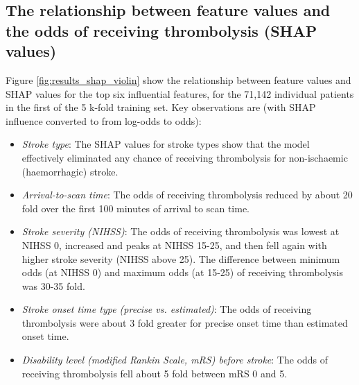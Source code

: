 
\subsection{The relationship between feature values and the odds of receiving thrombolysis (SHAP values)}

Figure \ref{fig:results_shap_violin} show the relationship between feature values and SHAP values for the top six influential features, for the 71,142 individual patients in the first of the 5 k-fold training set. Key observations are (with SHAP influence converted to from log-odds to odds):

\begin{itemize}
    \item \emph{Stroke type}: The SHAP values for stroke types show that the model effectively eliminated any chance of receiving thrombolysis for non-ischaemic (haemorrhagic) stroke.
    \item \emph{Arrival-to-scan time}: The odds of receiving thrombolysis reduced by about 20 fold over the first 100 minutes of arrival to scan time.
    \item \emph{Stroke severity (NIHSS)}: The odds of receiving thrombolysis was lowest at NIHSS 0, increased and peaks at NIHSS 15-25, and then fell again with higher stroke severity (NIHSS above 25). The difference between minimum odds (at NIHSS 0) and maximum odds (at 15-25) of receiving thrombolysis was 30-35 fold.
    \item \emph{Stroke onset time type (precise vs. estimated)}: The odds of receiving thrombolysis were about 3 fold greater for precise onset time than estimated onset time.
    \item \emph{Disability level (modified Rankin Scale, mRS) before stroke}: The odds of receiving thrombolysis fell about 5 fold between mRS 0 and 5.
\end{itemize}


